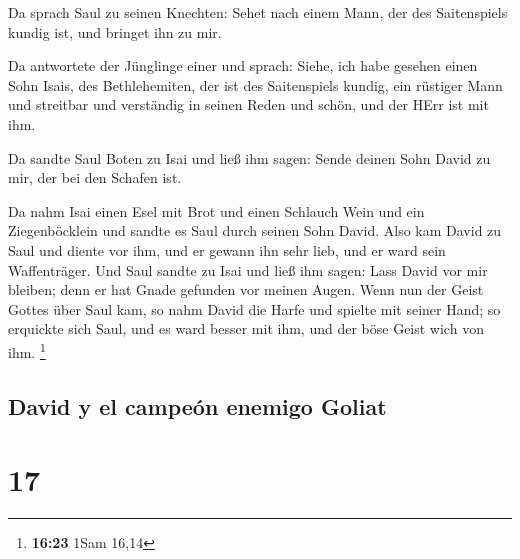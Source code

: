  Da sprach Saul zu seinen Knechten: Sehet nach einem
Mann, der des Saitenspiels kundig ist, und bringet ihn zu mir.

 Da antwortete der Jünglinge einer und sprach: Siehe, ich
habe gesehen einen Sohn Isais, des Bethlehemiten, der ist des
Saitenspiels kundig, ein rüstiger Mann und streitbar und verständig in
seinen Reden und schön, und der HErr ist mit ihm.

 Da sandte Saul Boten zu Isai und ließ ihm sagen: Sende
deinen Sohn David zu mir, der bei den Schafen ist.

 Da nahm Isai einen Esel mit Brot und einen Schlauch Wein
und ein Ziegenböcklein und sandte es Saul durch seinen Sohn David.
 Also kam David zu Saul und diente vor ihm, und er gewann
ihn sehr lieb, und er ward sein Waffenträger.  Und Saul
sandte zu Isai und ließ ihm sagen: Lass David vor mir bleiben; denn er
hat Gnade gefunden vor meinen Augen.  Wenn nun der Geist
Gottes über Saul kam, so nahm David die Harfe und spielte mit seiner
Hand; so erquickte sich Saul, und es ward besser mit ihm, und der böse
Geist wich von ihm. \footnote{\textbf{16:23} 1Sam 16,14}

\hypertarget{david-y-el-campeuxf3n-enemigo-goliat}{%
\subsection{David y el campeón enemigo
Goliat}\label{david-y-el-campeuxf3n-enemigo-goliat}}

\hypertarget{section-16}{%
\section{17}\label{section-16}}

